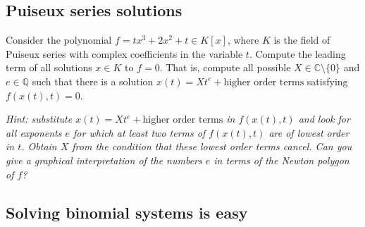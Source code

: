 \documentclass[11pt,reqno]{amsart}
\theoremstyle{definition}
\theoremstyle{remark}
\numberwithin{equation}{section}
\begin{document}
\subsection{Puiseux series solutions}

Consider the polynomial $f = tx^3 + 2x^2 + t \in K[x]$, where $K$ is the field of Puiseux series with complex coefficients in the variable $t$. Compute the leading term of all solutions $x \in K$ to $f = 0$. That is, compute all possible $X \in \mathbb{C} \setminus \{0\}$ and $e \in \mathbb{Q}$ such that there is a solution $x(t) = X t^e + \text{higher order terms}$ satisfying $f(x(t),t) = 0$. 

\textit{Hint: substitute $x(t) = X t^e + \text{higher order terms}$ in $f(x(t),t)$ and look for all exponents $e$ for which at least two terms of $f(x(t),t)$ are of lowest order in $t$. Obtain $X$ from the condition that these lowest order terms cancel. Can you give a graphical interpretation of the numbers $e$ in terms of the Newton polygon of $f$? }

\subsection{Solving binomial systems is easy}
\end{document}
